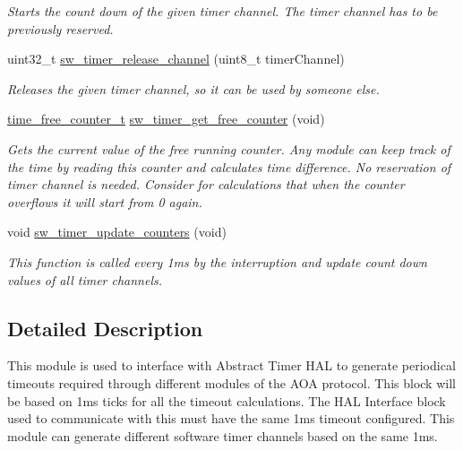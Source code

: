 \begin{DoxyCompactItemize}
\begin{DoxyCompactList}\small\item\em Starts the count down of the given timer channel. The timer channel has to be previously reserved. \end{DoxyCompactList}\item 
uint32\+\_\+t \hyperlink{group__sw__timer_ga7b71ad88ee7b0ef5d46b822a7b4ff2ea}{sw\+\_\+timer\+\_\+release\+\_\+channel} (uint8\+\_\+t timer\+Channel)
\begin{DoxyCompactList}\small\item\em Releases the given timer channel, so it can be used by someone else. \end{DoxyCompactList}\item 
\hyperlink{group__sw__timer_gaf131d055058588461e646ccea72592bc}{time\+\_\+free\+\_\+counter\+\_\+t} \hyperlink{group__sw__timer_ga1831e6f6e86215c63e02b5c3ab51bf6c}{sw\+\_\+timer\+\_\+get\+\_\+free\+\_\+counter} (void)
\begin{DoxyCompactList}\small\item\em Gets the current value of the free running counter. Any module can keep track of the time by reading this counter and calculates time difference. No reservation of timer channel is needed. Consider for calculations that when the counter overflows it will start from 0 again. \end{DoxyCompactList}\item 
void \hyperlink{group__sw__timer_gaabb732c0d372fe28a21b0b3d2c32e326}{sw\+\_\+timer\+\_\+update\+\_\+counters} (void)
\begin{DoxyCompactList}\small\item\em This function is called every 1ms by the interruption and update count down values of all timer channels. \end{DoxyCompactList}\end{DoxyCompactItemize}


\subsection{Detailed Description}
This module is used to interface with Abstract Timer H\+AL to generate periodical timeouts required through different modules of the A\+OA protocol. This block will be based on 1ms ticks for all the timeout calculations. The H\+AL Interface block used to communicate with this must have the same 1ms timeout configured. This module can generate different software timer channels based on the same 1ms. 



